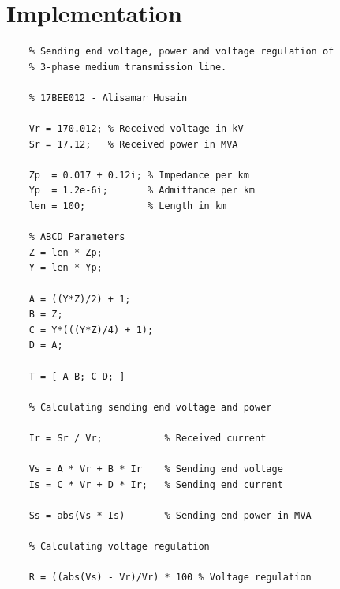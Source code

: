 \documentclass[a4paper,12pt]{article}
\begin{document}
  \section{Implementation}
  \begin{lstlisting}
    % Sending end voltage, power and voltage regulation of
    % 3-phase medium transmission line.

    % 17BEE012 - Alisamar Husain

    Vr = 170.012; % Received voltage in kV
    Sr = 17.12;   % Received power in MVA

    Zp  = 0.017 + 0.12i; % Impedance per km
    Yp  = 1.2e-6i;       % Admittance per km
    len = 100;           % Length in km

    % ABCD Parameters
    Z = len * Zp;
    Y = len * Yp;

    A = ((Y*Z)/2) + 1;
    B = Z;
    C = Y*(((Y*Z)/4) + 1);
    D = A;

    T = [ A B; C D; ]

    % Calculating sending end voltage and power

    Ir = Sr / Vr;           % Received current

    Vs = A * Vr + B * Ir    % Sending end voltage
    Is = C * Vr + D * Ir;   % Sending end current

    Ss = abs(Vs * Is)       % Sending end power in MVA

    % Calculating voltage regulation

    R = ((abs(Vs) - Vr)/Vr) * 100 % Voltage regulation
  \end{lstlisting}
\end{document}
